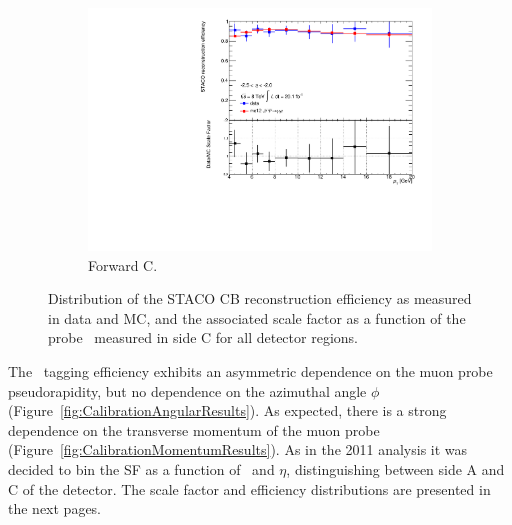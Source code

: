 \begin{figure}[htbp]
    \begin{subfigure}[b]{0.45\textwidth}
      \includegraphics[width=\textwidth]{PartCalibration2012/Plots/SFPlots/Forward_C_reco.pdf}
      \caption{Forward C.} \label{fig:CalibrationRecoSFForwardC}
    \end{subfigure}
    \caption{Distribution of the STACO CB reconstruction efficiency as measured in data and MC, and the associated scale factor as a function of the probe \pt\ measured in side C for all detector regions.}
  \label{fig:RecoEffSideC}
\end{figure}

The \xsm\ tagging efficiency exhibits an asymmetric dependence on the muon probe pseudorapidity, but no dependence on the azimuthal angle $\phi$ (Figure~\ref{fig:CalibrationAngularResults}). As expected, there is a strong dependence on the transverse momentum of the muon probe (Figure~\ref{fig:CalibrationMomentumResults}). As in the 2011 analysis it was decided to bin the SF as a function of \pt\ and $\eta$, distinguishing between side A and C of the detector. The scale factor and efficiency distributions are presented in the next pages. 

